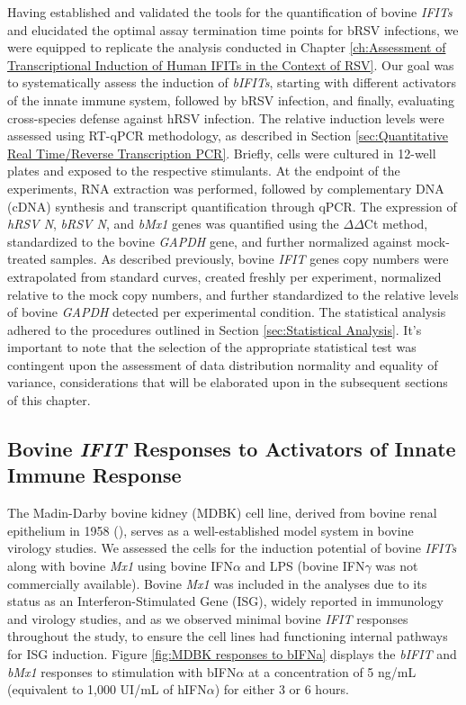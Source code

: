 Having established and validated the tools for the quantification of bovine \textit{IFITs} and elucidated the optimal assay termination time points for bRSV infections, we were equipped to replicate the analysis conducted in Chapter \ref{ch:Assessment of Transcriptional Induction of Human IFITs in the Context of RSV}. Our goal was to systematically assess the induction of \textit{bIFITs}, starting with different activators of the innate immune system, followed by bRSV infection, and finally, evaluating cross-species defense against hRSV infection. The relative induction levels were assessed using RT-qPCR methodology, as described in Section \ref{sec:Quantitative Real Time/Reverse Transcription PCR}. Briefly, cells were cultured in 12-well plates and exposed to the respective stimulants. At the endpoint of the experiments, RNA extraction was performed, followed by complementary DNA (cDNA) synthesis and transcript quantification through qPCR. The expression of \textit{hRSV N}, \textit{bRSV N}, and \textit{bMx1} genes was quantified using the \(\Delta\)\(\Delta\)Ct method, standardized to the bovine \textit{GAPDH} gene, and further normalized against mock-treated samples. As described previously, bovine \textit{IFIT} genes copy numbers were extrapolated from standard curves, created freshly per experiment, normalized relative to the mock copy numbers, and further standardized to the relative levels of bovine \textit{GAPDH} detected per experimental condition. The statistical analysis adhered to the procedures outlined in Section \ref{sec:Statistical Analysis}. It's important to note that the selection of the appropriate statistical test was contingent upon the assessment of data distribution normality and equality of variance, considerations that will be elaborated upon in the subsequent sections of this chapter.

\subsection{Bovine \textit{IFIT} Responses to Activators of Innate Immune Response} \label{subsec:Bovine IFIT Responses to Activators of Innate Immune Response}
The Madin-Darby bovine kidney (MDBK) cell line, derived from bovine renal epithelium in 1958 (\cite{Madin1958EstablishedOrigin.}), serves as a well-established model system in bovine virology studies. We assessed the cells for the induction potential of bovine \textit{IFITs} along with bovine \textit{Mx1} using bovine IFN\(\alpha\) and LPS (bovine IFN\(\gamma\) was not commercially available). Bovine \textit{Mx1} was included in the analyses due to its status as an Interferon-Stimulated Gene (ISG), widely reported in immunology and virology studies, and as we observed minimal bovine \textit{IFIT} responses throughout the study, to ensure the cell lines had functioning internal pathways for ISG induction. Figure \ref{fig:MDBK responses to bIFNa} displays the \textit{bIFIT} and \textit{bMx1} responses to stimulation with bIFN\(\alpha\) at a concentration of 5 ng/mL (equivalent to 1,000 UI/mL of hIFN\(\alpha\)) for either 3 or 6 hours.

